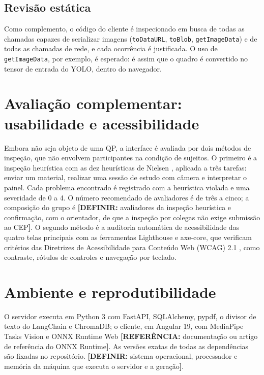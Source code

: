 \documentclass[portuguese,oneside]{tcc}
\newcommand{\referencia}[1]{\textcolor{blue!60!black}{\textbf{[REFERÊNCIA:} #1\textbf{]}}}
\newcommand{\definir}[1]{\textcolor{orange!75!black}{\textbf{[DEFINIR:} #1\textbf{]}}}
\begin{document}
\subsection{Revisão estática}

Como complemento, o código do cliente é inspecionado em busca de todas as chamadas capazes de serializar imagens (\texttt{toDataURL}, \texttt{toBlob}, \texttt{getImageData}) e de todas as chamadas de rede, e cada ocorrência é justificada. O uso de \texttt{getImageData}, por exemplo, é esperado: é assim que o quadro é convertido no tensor de entrada do YOLO, dentro do navegador.

\section{\label{sec:met-usab}Avaliação complementar: usabilidade e acessibilidade}

Embora não seja objeto de uma QP, a interface é avaliada por dois métodos de inspeção, que não envolvem participantes na condição de sujeitos. O primeiro é a inspeção heurística com as dez heurísticas de Nielsen \cite{Nie94}, aplicada a três tarefas: enviar um material, realizar uma sessão de estudo com câmera e interpretar o painel. Cada problema encontrado é registrado com a heurística violada e uma severidade de 0 a 4. O número recomendado de avaliadores é de três a cinco; a composição do grupo é \definir{avaliadores da inspeção heurística e confirmação, com o orientador, de que a inspeção por colegas não exige submissão ao CEP}. O segundo método é a auditoria automática de acessibilidade das quatro telas principais com as ferramentas Lighthouse e axe-core, que verificam critérios das Diretrizes de Acessibilidade para Conteúdo Web (WCAG) 2.1 \cite{W3C18}, como contraste, rótulos de controles e navegação por teclado.

\section{\label{sec:reprod}Ambiente e reprodutibilidade}

O servidor executa em Python 3 com FastAPI, SQLAlchemy, pypdf, o divisor de texto do LangChain e ChromaDB; o cliente, em Angular 19, com MediaPipe Tasks Vision e ONNX Runtime Web \referencia{documentação ou artigo de referência do ONNX Runtime}. As versões exatas de todas as dependências são fixadas no repositório. \definir{sistema operacional, processador e memória da máquina que executa o servidor e a geração}.
\end{document}
